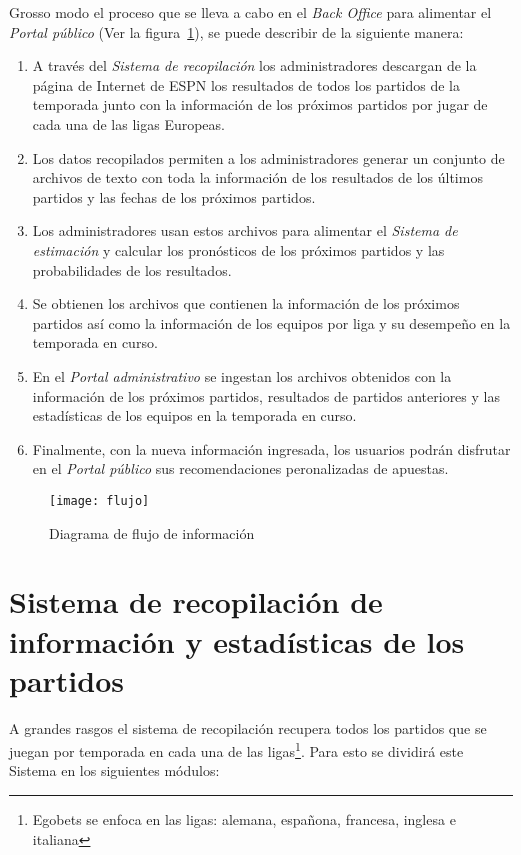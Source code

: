 Grosso modo el proceso que se lleva a cabo en el \emph{Back Office} para alimentar el \emph{Portal público} (Ver la figura~\ref{Fig:flujo}), se puede describir de la siguiente manera:
\begin{enumerate}
	\item A través del \emph{Sistema de recopilación} los administradores descargan de la página de Internet de ESPN los resultados de todos los partidos de la temporada junto con la información de los próximos partidos por jugar  de cada una de las ligas Europeas.
	\item Los datos recopilados permiten a los administradores generar un conjunto de archivos de texto con toda la información de los resultados de los últimos partidos y las fechas de los próximos partidos.
	\item Los administradores usan estos archivos para alimentar el \emph{Sistema de estimación} y calcular los pronósticos de los próximos partidos y las probabilidades de los resultados.
	\item Se obtienen los archivos que contienen la información de los próximos partidos así como la información de los equipos por liga y su desempeño en la temporada en curso.
	\item En el \emph{Portal administrativo} se ingestan los archivos obtenidos con la información de los próximos partidos, resultados de partidos anteriores y las estadísticas de los equipos en la temporada en curso.
	\item Finalmente, con la nueva información ingresada, los usuarios podrán disfrutar en el \emph{Portal público} sus recomendaciones peronalizadas de apuestas.
\end{enumerate}

\begin{figure}[!htb]\centering
   \begin {minipage}{1\textwidth}
     \texttt{[image: flujo]}
     \caption{Diagrama de flujo de información}\label{Fig:flujo}
   \end{minipage}
\end{figure}


\section{Sistema de recopilación de información y estadísticas de los partidos}
\graphicspath{{/Users/brunomedina/Dropbox/Tesis-Egobets/egobets-notas/resources/recopilador/}}

A grandes rasgos el sistema de recopilación recupera todos los partidos que se juegan por temporada en cada una de las ligas\footnote{Egobets se enfoca en las ligas: alemana, españona, francesa, inglesa e italiana}. Para esto se dividirá este Sistema en los siguientes módulos:

